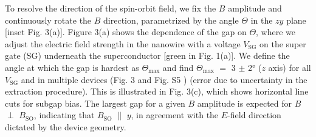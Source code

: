 To resolve the direction of the spin-orbit field, we fix the $B$ amplitude and continuously rotate the $B$ direction, parametrized by the angle $\Theta$ in the $zy$ plane [inset Fig. 3(a)].
Figure 3(a) shows the dependence of the gap on $\Theta$, where we adjust the electric field strength in the nanowire with a voltage $V_{\mathrm{SG}}$ on the super gate (SG) underneath the superconductor [green in Fig. 1(a)].
We define the angle at which the gap is hardest as $\Theta_{\mathrm{max}}$ and find $\Theta_{\mathrm{max}}$ $=$ 3 $\pm$ \ang{2} ($z$ axis) for all $V_{\mathrm{SG}}$ and in multiple devices (Fig. 3 and Fig. S5 \cite{Note1}) (error due to uncertainty in the extraction procedure).
This is illustrated in Fig. 3(c), which shows horizontal line cuts for subgap bias.
The largest gap for a given $B$ amplitude is expected for $B$ $\perp$ $B_{\mathrm{SO}}$, indicating that $B_{\mathrm{SO}}$ $\parallel$ $y$, in agreement with the $E$-field direction dictated by the device geometry.

